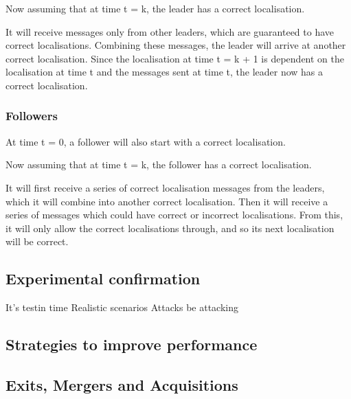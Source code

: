 Now assuming that at time t = k, the leader has a correct localisation.

It will receive messages only from other leaders, which are guaranteed to have correct localisations. Combining these messages, the leader will arrive at another correct localisation. Since the localisation at time t = k + 1 is dependent on the localisation at time t and the messages sent at time t, the leader now has a correct localisation.

\subsubsection{Followers}
At time t = 0, a follower will also start with a correct localisation.

Now assuming that at time t = k, the follower has a correct localisation.

It will first receive a series of correct localisation messages from the leaders, which it will combine into another correct localisation. Then it will receive a series of messages which could have correct or incorrect localisations. From this, it will only allow the correct localisations through, and so its next localisation will be correct.

\subsection{Experimental confirmation}
It's testin time
Realistic scenarios
Attacks be attacking



\subsection{Strategies to improve performance}
\subsection{Exits, Mergers and Acquisitions}